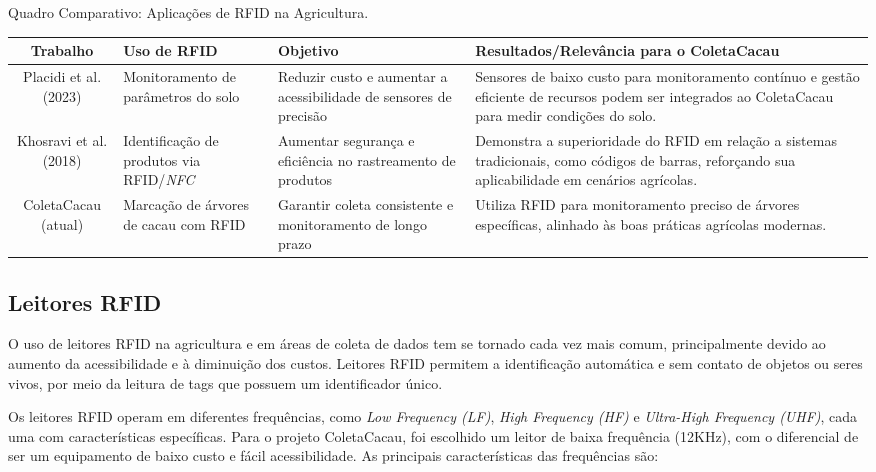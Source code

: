 \begin{quadro}[!htb]
    \centering
    \footnotesize
    \caption{Quadro Comparativo: Aplicações de RFID na Agricultura.}
	\begin{tabular}{|c|p{3cm}|p{3cm}|p{5cm}|}
	   \hline
	   \textbf{Trabalho} & \textbf{Uso de RFID} & \textbf{Objetivo} & \textbf{Resultados/Relevância para o ColetaCacau}\\
	   \hline
        Placidi et al. (2023) & Monitoramento de parâmetros do solo & Reduzir custo e aumentar a acessibilidade de sensores de precisão & Sensores de baixo custo para monitoramento contínuo e gestão eficiente de recursos podem ser integrados ao ColetaCacau para medir condições do solo. \\ 
	   \hline
        Khosravi et al. (2018) & Identificação de produtos via RFID/\textit{NFC} & Aumentar segurança e eficiência no rastreamento de produtos & Demonstra a superioridade do RFID em relação a sistemas tradicionais, como códigos de barras, reforçando sua aplicabilidade em cenários agrícolas. \\ 
	   \hline
        ColetaCacau (atual) & Marcação de árvores de cacau com RFID & Garantir coleta consistente e monitoramento de longo prazo & Utiliza RFID para monitoramento preciso de árvores específicas, alinhado às boas práticas agrícolas modernas. \\ 
	   \hline
	\end{tabular}
    \label{Tab:RfidInAgriculture}
\end{quadro}

\subsection{Leitores RFID}
O uso de leitores RFID na agricultura e em áreas de coleta de dados tem se tornado cada vez mais comum, principalmente devido ao aumento da acessibilidade e à diminuição dos custos. Leitores RFID permitem a identificação automática e sem contato de objetos ou seres vivos, por meio da leitura de tags que possuem um identificador único.

Os leitores RFID operam em diferentes frequências, como \textit{Low Frequency (LF)}, \textit{High Frequency (HF)} e \textit{Ultra-High Frequency (UHF)}, cada uma com características específicas. Para o projeto ColetaCacau, foi escolhido um leitor de baixa frequência (12KHz), com o diferencial de ser um equipamento de baixo custo e fácil acessibilidade. As principais características das frequências são:

